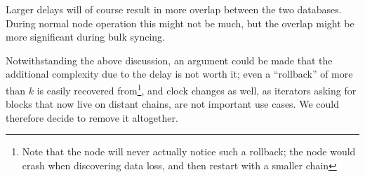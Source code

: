 Larger delays will of course result in more overlap between the two databases.
During normal node operation this might not be much, but the overlap might be
more significant during bulk syncing.

Notwithstanding the above discussion, an argument could be made that the
additional complexity due to the delay is not worth it; even a ``rollback'' of
more than $k$ is easily recovered from\footnote{Note that the node will never
actually notice such a rollback; the node would crash when discovering data
loss, and then restart with a smaller chain}, and clock changes as well, as
iterators asking for blocks that now live on distant chains, are not important
use cases. We could therefore decide to remove it altogether.
